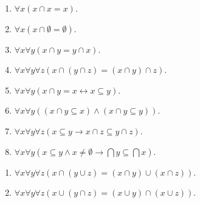 \begin{proposition}
    \leavevmode
        \begin{enumerate}[leftmargin=*, align=left, label=\textbf{(\alph*)}]
            \item $\forall x (x \cap x = x)$.
            \item $\forall x (x \cap \emptyset = \emptyset)$.
            \item $\forall x \forall y (x \cap y = y \cap x)$.
            \item $\forall x \forall y \forall z (x \cap (y \cap z) = (x \cap y) \cap z)$.
            \item $\forall x \forall y (x \cap y = x \leftrightarrow x \subseteq y)$.
            \item $\forall x \forall y ( (x \cap y \subseteq x) \land (x \cap y \subseteq y))$.
            \item $\forall x \forall y \forall z (x \subseteq y \rightarrow x \cap z \subseteq y \cap z)$.
            \item $\forall x \forall y (x \subseteq y \land x \neq \emptyset \rightarrow \bigcap y \subseteq \bigcap x)$.
        \end{enumerate}
\end{proposition}

\begin{proposition}[Distributividade]
    \leavevmode
        \begin{enumerate}[leftmargin=*, align=left, label=\textbf{(\alph*)}]
            \item $\forall x \forall y \forall z (x \cap (y \cup z) = (x \cap y) \cup (x \cap z))$.
            \item $\forall x \forall y \forall z (x \cup (y \cap z) = (x \cup y) \cap (x \cup z))$.
        \end{enumerate}
\end{proposition}

